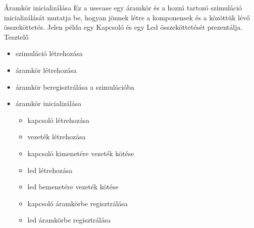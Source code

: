 \usecase
{Áramkör inicializálása}
{Ez a usecase egy áramkör és a hozzá tartozó szimuláció inicializálását mutatja be, hogyan jönnek létre a komponensek és a közöttük lévő összeköttetés. Jelen példa egy Kapcsoló és egy Led összeköttetését prezentálja.}
{Tesztelő}
{\vspace{-15pt}
\begin{itemize}
\setlength{\itemsep}{0cm}%
\setlength{\parskip}{0cm}%
\item szimuláció létrehozása
\item áramkör létrehozása
\item áramkör beregisztrálása a szimulációba
\item áramkör inicializálása
\begin{itemize}
\setlength{\itemsep}{0cm}%
\setlength{\parskip}{0cm}%
	\item kapcsoló létrehozása
	\item vezeték létrehozása
	\item kapcsoló kimenetére vezeték kötése
	\item led létrehozása
	\item led bemenetére vezeték kötése
	\item kapcsoló áramkörbe regisztrálása
	\item led áramkörbe regisztrálása
\end{itemize}
\end{itemize}
\vspace{-15pt}}

